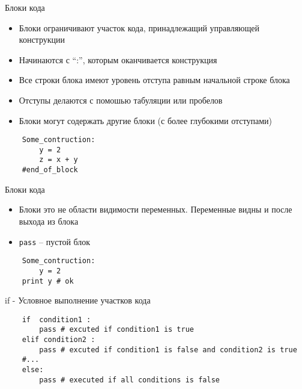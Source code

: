 \documentclass{article}
\begin{document}
\LARGE

\begin{center} Блоки кода \end{center}
\begin{itemize}
	\item Блоки ограничивают участок кода, принадлежащий управляющей конструкции
	\item Начинаются с “:”, которым оканчивается конструкция
	\item Все строки блока имеют уровень отступа равным начальной строке блока
	\item Отступы делаются с помошью табуляции или пробелов
	\item Блоки могут содержать другие блоки (с более глубокими отступами)
\end{itemize}
\vspace{15pt}
\begin{lstlisting}
	Some_contruction:
		y = 2
		z = x + y
	#end_of_block
\end{lstlisting}
\newpage

\begin{center} Блоки кода \end{center}
\begin{itemize}
	\item Блоки это не области видимости переменных. Переменные видны и после выхода из блока
	\item \lstinline$pass$ – пустой блок
\end{itemize}
\vspace{15pt}
\begin{lstlisting}
	Some_contruction:
		y = 2
	print y # ok
\end{lstlisting}
\newpage

\begin{center} if - Условное выполнение участков кода \end{center}
\vspace{15pt}
\begin{lstlisting}
	if  condition1 :
	    pass # excuted if condition1 is true
	elif condition2 :
	    pass # excuted if condition1 is false and condition2 is true
	#...
	else:
	    pass # executed if all conditions is false
\end{lstlisting}
\newpage
\end{document}
